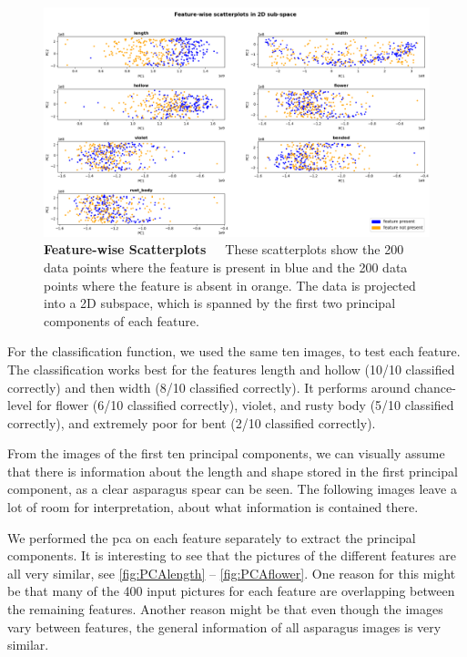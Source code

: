 \begin{figure}[h]
	\centering
	\includegraphics[scale=0.35]{Figures/chapter04/pca_scatterplot.png}
	\decoRule
	\caption[Feature-Wise Scatterplots]{\textbf{Feature-wise Scatterplots}~~~These scatterplots show the 200 data points where the feature is present in blue and the 200 data points where the feature is absent in orange. The data is projected into a 2D subspace, which is spanned by the first two principal components of each feature.}
	\label{fig:PCAscatter}
\end{figure}

For the classification function, we used the same ten images, to test each feature. The classification works best for the features length and hollow (10/10 classified correctly) and then width (8/10 classified correctly). It performs around chance-level for flower (6/10 classified correctly), violet, and rusty body (5/10 classified correctly), and extremely poor for bent (2/10 classified correctly).   

From the images of the first ten principal components, we can visually assume that there is information about the length and shape stored in the first principal component, as a clear asparagus spear can be seen. The following images leave a lot of room for interpretation, about what information is contained there.

We performed the \acrshort{pca} on each feature separately to extract the principal components. It is interesting to see that the pictures of the different features are all very similar, see \autoref{fig:PCAlength} -- \autoref{fig:PCAflower}. One reason for this might be that many of the 400 input pictures for each feature are overlapping between the remaining features. Another reason might be that even though the images vary between features, the general information of all asparagus images is very similar.

